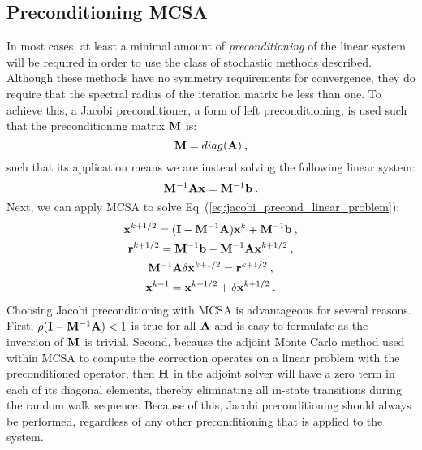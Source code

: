\subsection{Preconditioning MCSA}
\label{sec:stochastic_preconditioning}
In most cases, at least a minimal amount of \textit{preconditioning}
of the linear system will be required in order to use the class of
stochastic methods described. Although these methods have no symmetry
requirements for convergence, they do require that the spectral radius
of the iteration matrix be less than one. To achieve this, a Jacobi
preconditioner, a form of left preconditioning, is used such that the
preconditioning matrix $\mathbf{M}$ is:
\begin{equation}
  \mathbf{M} = diag(\mathbf{A})\:,
  \label{eq:jacobi_preconditioner}
\end{equation}
such that its application means we are instead solving the following
linear system:
\begin{equation}
  \mathbf{M}^{-1}\mathbf{A}\mathbf{x} = \mathbf{M}^{-1}\mathbf{b}\:.
  \label{eq:jacobi_precond_linear_problem}
\end{equation}
Next, we can apply MCSA to solve
Eq~(\ref{eq:jacobi_precond_linear_problem}): 
\begin{subequations}
  \begin{gather}
    \mathbf{x}^{k+1/2} = (\mathbf{I} - \mathbf{M}^{-1}\mathbf{A})\mathbf{x}^k +
    \mathbf{M}^{-1}\mathbf{b}\:,\\ \mathbf{r}^{k+1/2} = \mathbf{M}^{-1}\mathbf{b} -
    \mathbf{M}^{-1}\mathbf{A}\mathbf{x}^{k+1/2}\:,\\ \mathbf{M}^{-1}\mathbf{A}\delta\mathbf{x}^{k+1/2}
    = \mathbf{r}^{k+1/2}\:,\\ \mathbf{x}^{k+1} = \mathbf{x}^{k+1/2} + \delta
    \mathbf{x}^{k+1/2}\:.
    \label{eq:jacobi_preconditioned_mcsa}
  \end{gather}
\end{subequations}
Choosing Jacobi preconditioning with MCSA is advantageous for several
reasons. First, $\rho(\mathbf{I} - \mathbf{M}^{-1}\mathbf{A}) < 1$ is true for
all $\mathbf{A}$ and is easy to formulate as the inversion of $\mathbf{M}$ is
trivial. Second, because the adjoint Monte Carlo method used within MCSA to
compute the correction operates on a linear problem with the
preconditioned operator, then $\mathbf{H}$ in the adjoint solver will have
a zero term in each of its diagonal elements, thereby eliminating
all in-state transitions during the random walk sequence. Because of
this, Jacobi preconditioning should always be performed, regardless of
any other preconditioning that is applied to the system.

